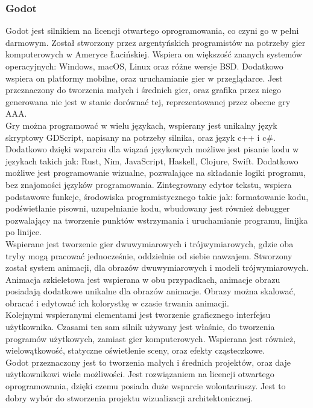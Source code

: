\documentclass{article} %
\begin{document}
        
        \subsubsection*{Godot}
        Godot jest silnikiem na licencji otwartego oprogramowania, co czyni go w pełni darmowym. Został stworzony przez argentyńskich programistów na potrzeby gier komputerowych w Ameryce Łacińskiej. Wspiera on większość znanych systemów operacyjnych: Windows, macOS, Linux oraz różne wersje BSD. Dodatkowo wspiera on platformy mobilne, oraz uruchamianie gier w przeglądarce. Jest przeznaczony do tworzenia małych i średnich gier, oraz grafika przez niego generowana nie jest w stanie dorównać tej, reprezentowanej przez obecne gry AAA.
        \\
        
        Gry można programować w wielu językach, wspierany jest unikalny język skryptowy GDScript, napisany na potrzeby silnika, oraz język c++ i c\#. Dodatkowo dzięki wsparciu dla wiązań językowych możliwe jest pisanie kodu w językach takich jak: Rust, Nim, JavaScript, Haskell, Clojure, Swift. Dodatkowo możliwe jest programowanie wizualne, pozwalające na składanie logiki programu, bez znajomości języków programowania. Zintegrowany edytor tekstu, wspiera podstawowe funkcje, środowiska programistycznego takie jak: formatowanie kodu, podświetlanie pisowni, uzupełnianie kodu, wbudowany jest również debugger pozwalający na tworzenie punktów wstrzymania i uruchamianie programu, linijka po linijce.
        \\
        
        Wspierane jest tworzenie gier dwuwymiarowych i trójwymiarowych, gdzie oba tryby mogą pracować jednocześnie, oddzielnie od siebie nawzajem. Stworzony został system animacji, dla obrazów dwuwymiarowych i modeli trójwymiarowych. Animacja szkieletowa jest wspierana w obu przypadkach, animacje obrazu posiadają dodatkowe unikalne dla obrazów animacje. Obrazy można skalować, obracać i edytować ich kolorystkę w czasie trwania animacji. 
        \\
        
        Kolejnymi wspieranymi elementami jest tworzenie graficznego interfejsu użytkownika. Czasami ten sam silnik używany jest właśnie, do tworzenia programów użytkowych, zamiast gier komputerowych. Wspierana jest również, wielowątkowość, statyczne oświetlenie sceny, oraz efekty cząsteczkowe.
        \\
        
        Godot przeznaczony jest to tworzenia małych i średnich projektów, oraz daje użytkownikowi wiele możliwości. Jest rozwiązaniem na licencji otwartego oprogramowania, dzięki czemu posiada duże wsparcie wolontariuszy. Jest to dobry wybór do stworzenia projektu wizualizacji architektonicznej.
        \\
        
\end{document}
